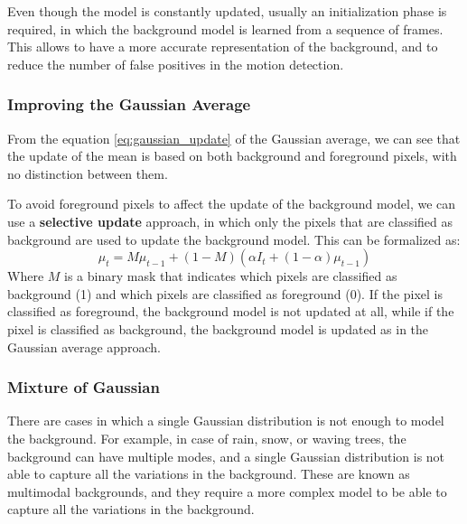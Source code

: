 Even though the model is constantly updated, usually an initialization phase is required, in which the background model is learned from a sequence of frames. This allows to have a more accurate
representation of the background, and to reduce the number of false positives in the motion detection.

\subsubsection{Improving the Gaussian Average}
From the equation \ref{eq:gaussian_update} of the Gaussian average, we can see that the update of the mean is based on both
background and foreground pixels, with no distinction between them.

To avoid foreground pixels to affect the update of the background model, we can use a \textbf{selective update} approach,
in which only the pixels that are classified as background are used to update the background model. This can be formalized as:
\begin{equation}
    \mu_t = M\mu_{t-1} + (1 - M)(\alpha I_t + (1 - \alpha) \mu_{t-1})
\end{equation}
Where $M$ is a binary mask that indicates which pixels are classified as background (1) and which pixels are classified as foreground (0).
If the pixel is classified as foreground, the background model is not updated at all, while if the pixel is classified as background, 
the background model is updated as in the Gaussian average approach.

\subsubsection{Mixture of Gaussian}
There are cases in which a single Gaussian distribution is not enough to model the background. For example,
in case of rain, snow, or waving trees, the background can have multiple modes, and a single Gaussian distribution is not able to capture all the variations in the background.
These are known as multimodal backgrounds, and they require a more complex model to be able to capture all the variations in the background.

